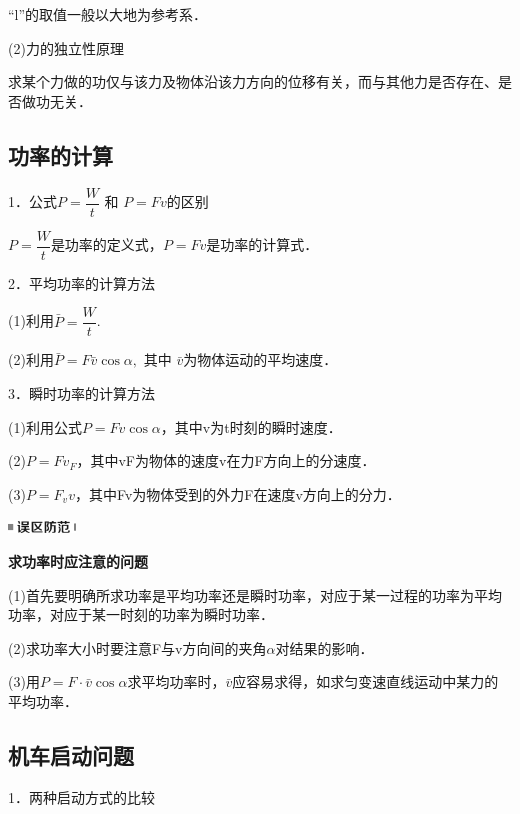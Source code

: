 ``l''的取值一般以大地为参考系．

(2)力的独立性原理

求某个力做的功仅与该力及物体沿该力方向的位移有关，而与其他力是否存在、是否做功无关．
\subsection{功率的计算}

1．公式$P=\dfrac{W}{t}$ 和 $P=F v$的区别

$P=\dfrac{W}{t}$是功率的定义式，$P=F v$是功率的计算式．

2．平均功率的计算方法

(1)利用$\bar{P}=\dfrac{W}{t}$.

(2)利用$\bar{P}=F \bar{v} \cos \alpha,$ 其中 $\bar{v}$为物体运动的平均速度．

3．瞬时功率的计算方法

(1)利用公式$P=Fv\cos \alpha$，其中v为t时刻的瞬时速度．

(2)$P=F v_{F}$，其中vF为物体的速度v在力F方向上的分速度．

(3)$P=F_v v$，其中Fv为物体受到的外力F在速度v方向上的分力．

\begin{center}\includegraphics[width=0.70833in,height=0.125in]{media/image34.png}

\textbf{求功率时应注意的问题}
\end{center}


(1)首先要明确所求功率是平均功率还是瞬时功率，对应于某一过程的功率为平均功率，对应于某一时刻的功率为瞬时功率．

(2)求功率大小时要注意F与v方向间的夹角$\alpha$对结果的影响．

(3)用$P=F \cdot \bar{v} \cos \alpha$求平均功率时，$\bar v$应容易求得，如求匀变速直线运动中某力的平均功率．

\subsection{机车启动问题}

1．两种启动方式的比较

